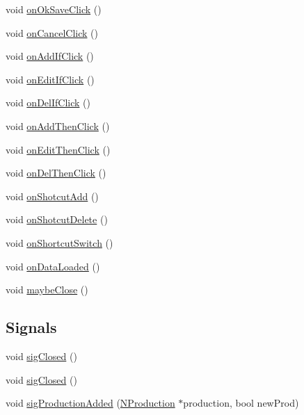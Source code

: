 \begin{DoxyCompactItemize}
\item 
void \hyperlink{class_rules_wnd_a0458a2000b1e9b11f4230965499da8c1}{onOkSaveClick} ()
\item 
void \hyperlink{class_rules_wnd_adc9f31fc930cb24e31d5c6fb2280ef49}{onCancelClick} ()
\item 
void \hyperlink{class_rules_wnd_a03a25da9fc898ed19e5cab37d3f3f1a8}{onAddIfClick} ()
\item 
void \hyperlink{class_rules_wnd_afa4a86d0a2a1cbc451806b86d5ff4772}{onEditIfClick} ()
\item 
void \hyperlink{class_rules_wnd_a17a200f59e735d1781674b0bc23a05ac}{onDelIfClick} ()
\item 
void \hyperlink{class_rules_wnd_a42db02675546175de00ac7e473585f10}{onAddThenClick} ()
\item 
void \hyperlink{class_rules_wnd_a7807dcc88f5702e5173bc18b65bcaa14}{onEditThenClick} ()
\item 
void \hyperlink{class_rules_wnd_ae6d3443e6f2aeb1c9cef3621024bf1d5}{onDelThenClick} ()
\item 
void \hyperlink{class_rules_wnd_a46bd80dde37a9d38a6ea9e0a23f049fb}{onShotcutAdd} ()
\item 
void \hyperlink{class_rules_wnd_a3a1bc2e91e25a9755dc83db6117422c2}{onShotcutDelete} ()
\item 
void \hyperlink{class_rules_wnd_acfe133aabf1eadca9cd81f4788aaa6de}{onShortcutSwitch} ()
\item 
void \hyperlink{class_rules_wnd_a6f1ace0a9f8ec0a2726b3d6584613fa8}{onDataLoaded} ()
\item 
void \hyperlink{class_rules_wnd_a1a43208f053f6998daf496edb18373ea}{maybeClose} ()
\end{DoxyCompactItemize}
\subsection*{Signals}
\begin{DoxyCompactItemize}
\item 
void \hyperlink{class_rules_wnd_adfff1edd795ebd25e3c8811c5e6ff5be}{sigClosed} ()
\item 
void \hyperlink{class_rules_wnd_adfff1edd795ebd25e3c8811c5e6ff5be}{sigClosed} ()
\item 
void \hyperlink{class_rules_wnd_aaa92fe43a0a9cd4cb5c74bfb90cc3ebf}{sigProductionAdded} (\hyperlink{class_n_production}{NProduction} $\ast$production, bool newProd)
\end{DoxyCompactItemize}
